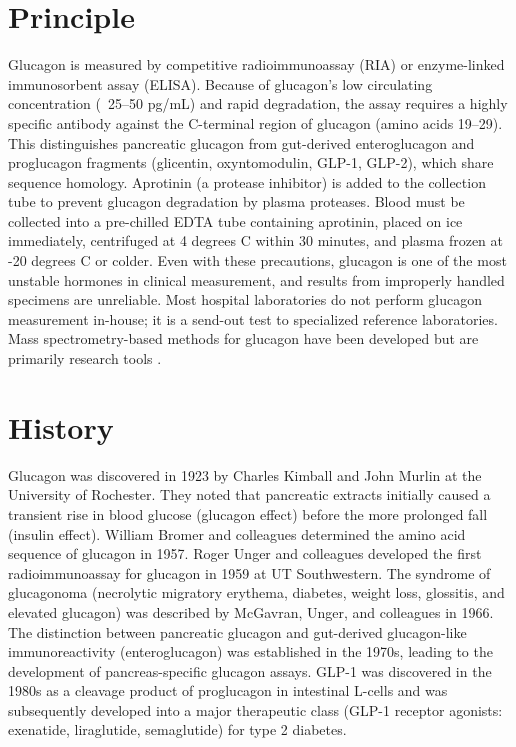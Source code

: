 \section*{Principle}
Glucagon is measured by competitive radioimmunoassay (RIA) or enzyme-linked immunosorbent assay (ELISA). Because of glucagon's low circulating concentration (~25--50 pg/mL) and rapid degradation, the assay requires a highly specific antibody against the C-terminal region of glucagon (amino acids 19--29). This distinguishes pancreatic glucagon from gut-derived enteroglucagon and proglucagon fragments (glicentin, oxyntomodulin, GLP-1, GLP-2), which share sequence homology. Aprotinin (a protease inhibitor) is added to the collection tube to prevent glucagon degradation by plasma proteases. Blood must be collected into a pre-chilled EDTA tube containing aprotinin, placed on ice immediately, centrifuged at 4 degrees C within 30 minutes, and plasma frozen at -20 degrees C or colder. Even with these precautions, glucagon is one of the most unstable hormones in clinical measurement, and results from improperly handled specimens are unreliable. Most hospital laboratories do not perform glucagon measurement in-house; it is a send-out test to specialized reference laboratories. Mass spectrometry-based methods for glucagon have been developed but are primarily research tools \cite{tietz2023textbook}.

\section*{History}
Glucagon was discovered in 1923 by Charles Kimball and John Murlin at the University of Rochester. They noted that pancreatic extracts initially caused a transient rise in blood glucose (glucagon effect) before the more prolonged fall (insulin effect). William Bromer and colleagues determined the amino acid sequence of glucagon in 1957. Roger Unger and colleagues developed the first radioimmunoassay for glucagon in 1959 at UT Southwestern. The syndrome of glucagonoma (necrolytic migratory erythema, diabetes, weight loss, glossitis, and elevated glucagon) was described by McGavran, Unger, and colleagues in 1966. The distinction between pancreatic glucagon and gut-derived glucagon-like immunoreactivity (enteroglucagon) was established in the 1970s, leading to the development of pancreas-specific glucagon assays. GLP-1 was discovered in the 1980s as a cleavage product of proglucagon in intestinal L-cells and was subsequently developed into a major therapeutic class (GLP-1 receptor agonists: exenatide, liraglutide, semaglutide) for type 2 diabetes.

